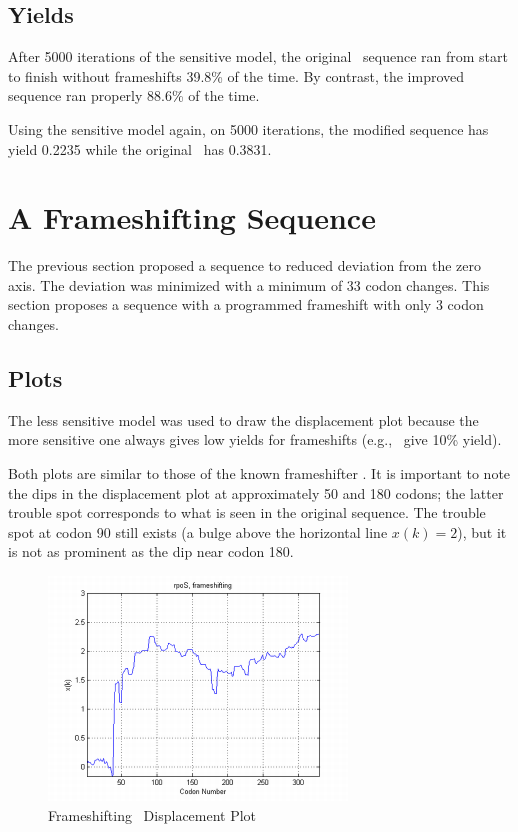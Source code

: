 \documentclass[10pt,twocolumn,draft]{article}
\begin{document}
\subsection{Yields}

After 5000 iterations of the sensitive model, the original \rpoS\ sequence ran from start to finish without frameshifts 39.8\% of the time.
By contrast, the improved sequence ran properly 88.6\% of the time.

Using the sensitive model again, on 5000 iterations, the modified sequence has yield 0.2235 while the original \rpoS\ has 0.3831.

\section{A Frameshifting Sequence}

The previous section proposed a sequence to reduced deviation from the zero axis.  
The deviation was minimized with a minimum of 33 codon changes.
This section proposes a sequence with a programmed frameshift with only 3 codon changes.

\subsection{Plots}

The less sensitive model was used to draw the displacement plot because the more sensitive one always gives low yields for frameshifts (e.g., \prfB\ give 10\% yield).

Both plots are similar to those of the known frameshifter \prfB.
It is important to note the dips in the displacement plot at approximately 50 and 180 codons; the latter trouble spot corresponds to what is seen in the original sequence.
The trouble spot at codon 90 still exists (a bulge above the horizontal line $x(k)=2$), but it is not as prominent as the dip near codon 180.

\begin{figure}[htp]
    \centering
    \caption{Frameshifting \rpoS\ Displacement Plot}
    \label{rposfs:disp}
    \includegraphics{rpoS/frameshift.png}
\end{figure}
\end{document}
